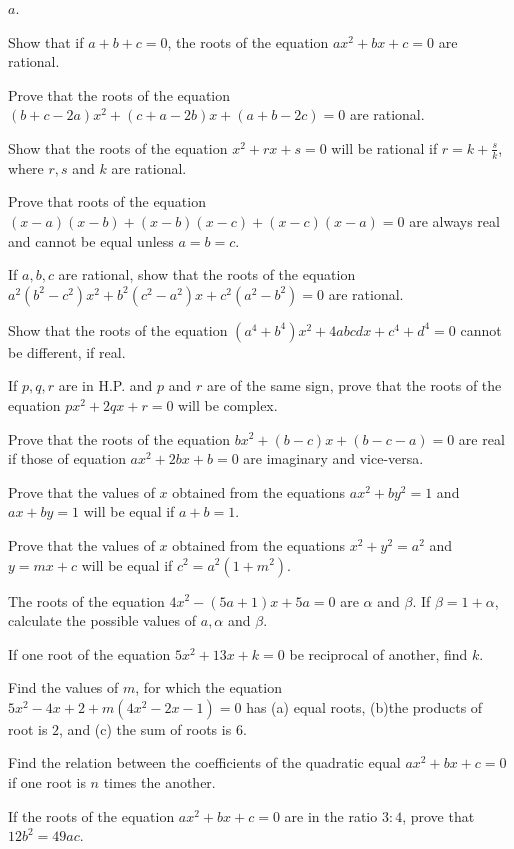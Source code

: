   $a$.
\item Show that if $a + b + c = 0$, the roots of the equation $ax^2 + bx + c = 0$ are rational.
\item Prove that the roots of the equation $(b + c - 2a)x^2 + (c + a - 2b)x + (a + b - 2c) = 0$ are rational.
\item Show that the roots of the equation $x^2 + rx + s = 0$ will be rational if $r = k + \frac{s}{k}$, where $r, s$ and $k$ are
  rational.
\item Prove that roots of the equation $(x - a)(x - b) + (x - b)(x - c) + (x - c)(x - a) = 0$ are always real and cannot be equal
  unless $a = b = c$.
\item If $a, b, c$ are rational, show that the roots of the equation $a^2(b^2 - c^2)x^2 + b^2(c^2 - a^2)x + c^2(a^2 - b^2) = 0$ are
  rational.
\item Show that the roots of the equation $(a^4 + b^4)x^2 + 4abcdx + c^4 + d^4 = 0$ cannot be different, if real.
\item If $p, q, r$ are in H.P. and $p$ and $r$ are of the same sign, prove that the roots of the equation $px^2 + 2qx + r = 0$ will
  be complex.
\item Prove that the roots of the equation $bx^2 + (b - c)x + (b - c - a) = 0$ are real if those of equation $ax^2 + 2bx + b = 0$
  are imaginary and vice-versa.
\item Prove that the values of $x$ obtained from the equations $ax^2 + by^2 = 1$ and $ax + by = 1$ will be equal if $a + b = 1$.
\item Prove that the values of $x$ obtained from the equations $x^2 + y^2 = a^2$ and $y = mx + c$ will be equal if $c^2 = a^2(1 +
  m^2)$.
\item The roots of the equation $4x^2 - (5a + 1)x + 5a = 0$ are $\alpha$ and $\beta$. If $\beta = 1 + \alpha$, calculate the
  possible values of $a, \alpha$ and $\beta$.
\item If one root of the equation $5x^2 + 13x + k = 0$ be reciprocal of another, find $k$.
\item Find the values of $m$, for which the equation $5x^2 - 4x + 2 + m(4x^2 - 2x - 1) = 0$ has (a) equal roots, (b)the products of
  root is $2$, and (c) the sum of roots is $6$.
\item Find the relation between the coefficients of the quadratic equal $ax^2 + bx + c = 0$ if one root is $n$ times the another.
\item If the roots of the equation $ax^2 + bx + c = 0$ are in the ratio $3:4$, prove that $12b^2 = 49ac$.
